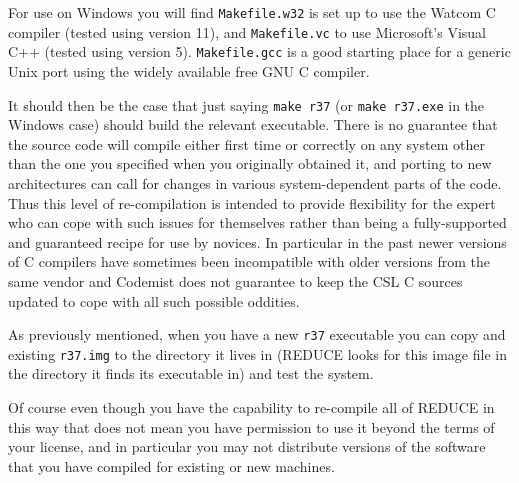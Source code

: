 \documentclass[a4paper,11pt]{article}
\begin{document}
For use on Windows you will find \verb+Makefile.w32+ is set up to use
the Watcom C compiler (tested using version 11), and \verb+Makefile.vc+
to use Microsoft's Visual C++ (tested using version 5).  \verb+Makefile.gcc+
is a good starting place for a generic Unix port using the widely
available free GNU C compiler.

It should then be the case that just saying \verb+make r37+ (or
\verb+make r37.exe+ in the Windows case) should build the relevant
executable.  There is no guarantee that the source code will compile
either first time or correctly on any system other than the
one you specified when you originally obtained it, and porting to new
architectures can call for changes in various system-dependent parts of
the code. Thus this level of re-compilation is intended to provide flexibility
for the expert who can cope with such issues for themselves rather than being
a fully-supported and guaranteed recipe for use by novices. In particular
in the past newer versions of C compilers have sometimes been incompatible
with older versions from the same vendor and Codemist does not guarantee
to keep the CSL C sources updated to cope with all such possible oddities.

As previously mentioned, when you have a new \verb+r37+ executable you can
copy and existing \verb+r37.img+ to the directory it lives in (REDUCE looks
for this image file in the directory it finds its executable in) and
test the system.

Of course even though you have the capability to re-compile all of REDUCE
in this way that does not mean you have permission to use it beyond the
terms of your license, and in particular you may not distribute versions
of the software that you have compiled for existing or new machines.
\end{document}
